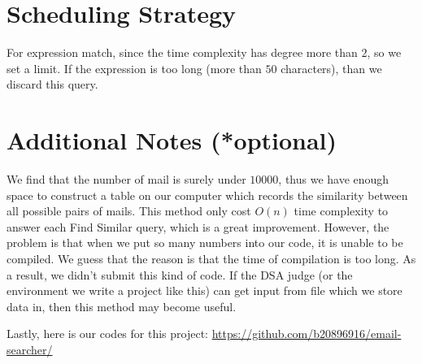 \documentclass{article}
\begin{document}
\section*{Scheduling Strategy}
For expression match, since the time complexity has degree more than $2$, so we set a limit. If the expression is too long (more than $50$ characters), than we discard this query.


\section*{Additional Notes (*optional)}

We find that the number of mail is surely under $10000$, thus we have enough space to construct a table on our computer which records the similarity between all possible pairs of mails. This method only cost $O(n)$ time complexity to answer each Find Similar query, which is a great improvement. However, the problem is that when we put so many numbers into our code, it is unable to be compiled. We guess that the reason is that the time of compilation is too long. As a result, we didn't submit this kind of code. If the DSA judge (or the environment we write a project like this) can get input from file which we store data in, then this method may become useful.

Lastly, here is our codes for this project: \url{https://github.com/b20896916/email-searcher/}
\end{document}
